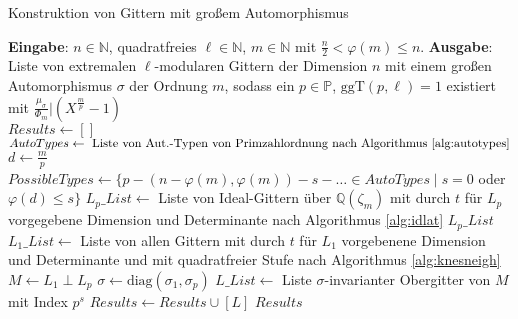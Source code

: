\documentclass[12pt,a4paper,halfparskip,headsepline,bibtotocnumbered]{scrreprt}
\theoremstyle{nummermitklammern}
\theoremstyle{nonumberbreak}
\newcommand{\N}{\mathbb{N}}
\newcommand{\Q}{\mathbb{Q}}
\renewcommand{\P}{\mathbb{P}}
\newcommand{\ggT}{\text{ggT}}
\begin{document}
\begin{algorithm}[H]
	\caption{Konstruktion von Gittern mit großem Automorphismus}\label{alg:largeauto}
	\begin{algorithmic}[1]
		\State \textbf{Eingabe}: $n \in \N$, quadratfreies $\ell \in \N$, $m \in \N$ mit $\frac{n}{2} < \varphi(m) \leq n$.
		\State \textbf{Ausgabe}: Liste von extremalen $\ell$-modularen Gittern der Dimension $n$ mit einem großen Automorphismus $\sigma$ der Ordnung $m$, sodass ein $p \in \P$, $\ggT(p, \ell) = 1$ existiert mit $\frac{\mu_\sigma}{\Phi_m} \vert (X^\frac{m}{p}-1)$
		\\
		\State $Results \gets []$
		\State $AutoTypes \gets \text{ Liste von Aut.-Typen von Primzahlordnung nach Algorithmus \eqref{alg:autotypes}}$
		\For {$p \in \lbrace q \in \P \mid q \vert m, \ggT(q, \ell) > 1 \rbrace$}
			\State $d \gets \frac{m}{p}$
			\State $PossibleTypes \gets \lbrace p - (n - \varphi(m), \varphi(m)) - s - \dots \in AutoTypes \mid s = 0$ oder $\varphi(d) \leq s \rbrace$
				\State $L_p\_List \gets$ Liste von Ideal-Gittern über $\Q(\zeta_m)$ mit durch $t$ für $L_p$ vorgegebene Dimension und Determinante nach Algorithmus \eqref{alg:idlat}
					\Return $L_p\_List$
				\EndIf
					\State $L_1\_List \gets$ Liste von allen Gittern mit durch $t$ für $L_1$ vorgebenene Dimension und Determinante und mit quadratfreier Stufe nach Algorithmus \eqref{alg:knesneigh}
								\State $M \gets L_1 \perp L_p$
								\State $\sigma \gets \text{diag}(\sigma_1, \sigma_p)$
								\State $L\_List \gets$ Liste $\sigma$-invarianter Obergitter von $M$ mit Index $p^s$
										\State $Results \gets Results \cup [L]$							
									\EndIf
								\EndFor
							\EndFor
						\EndFor
					\EndFor
				\EndFor
			\EndFor
		\EndFor
		\State \Return $Results$
	\end{algorithmic}
\end{algorithm}
\end{document}
